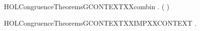 \newcommand{\HOLCongruenceTheoremsGCONTEXTXXcases}{\UseVerbatim{HOLCongruenceTheoremsGCONTEXTXXcases}}
\begin{SaveVerbatim}{HOLCongruenceTheoremsGCONTEXTXXcombin}
\HOLTokenTurnstile{} \HOLSymConst{\HOLTokenForall{}} .   \HOLSymConst{\HOLTokenConj{}}   \HOLSymConst{\HOLTokenImp{}}  ( \HOLConst{\HOLTokenCompose} )
\end{SaveVerbatim}
\newcommand{\HOLCongruenceTheoremsGCONTEXTXXcombin}{\UseVerbatim{HOLCongruenceTheoremsGCONTEXTXXcombin}}
\begin{SaveVerbatim}{HOLCongruenceTheoremsGCONTEXTXXIMPXXCONTEXT}
\HOLTokenTurnstile{} \HOLSymConst{\HOLTokenForall{}}.   \HOLSymConst{\HOLTokenImp{}}  
\end{SaveVerbatim}
\newcommand{\HOLCongruenceTheoremsGCONTEXTXXIMPXXCONTEXT}{\UseVerbatim{HOLCongruenceTheoremsGCONTEXTXXIMPXXCONTEXT}}
